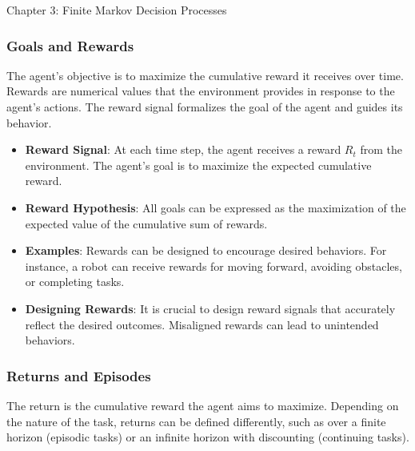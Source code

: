 \begin{notes}{Chapter 3: Finite Markov Decision Processes}
\begin{highlight}
    \end{highlight}
    
    \subsubsection*{Goals and Rewards}
    
    The agent's objective is to maximize the cumulative reward it receives over time. Rewards are numerical values that the environment provides in response to the agent's actions. The reward signal 
    formalizes the goal of the agent and guides its behavior.
    
    \begin{highlight}
    
        \begin{itemize}
            \item \textbf{Reward Signal}: At each time step, the agent receives a reward \(R_t\) from the environment. The agent's goal is to maximize the expected cumulative reward.
            \item \textbf{Reward Hypothesis}: All goals can be expressed as the maximization of the expected value of the cumulative sum of rewards.
            \item \textbf{Examples}: Rewards can be designed to encourage desired behaviors. For instance, a robot can receive rewards for moving forward, avoiding obstacles, or completing tasks.
            \item \textbf{Designing Rewards}: It is crucial to design reward signals that accurately reflect the desired outcomes. Misaligned rewards can lead to unintended behaviors.
        \end{itemize}
    
    \end{highlight}
    
    \subsubsection*{Returns and Episodes}
    
    The return is the cumulative reward the agent aims to maximize. Depending on the nature of the task, returns can be defined differently, such as over a finite horizon (episodic tasks) or an infinite 
    horizon with discounting (continuing tasks).
    
    \begin{highlight}
    

\end{highlight}
\end{notes}
